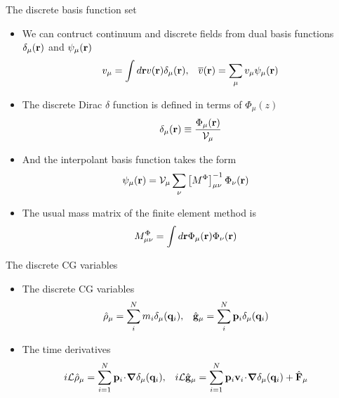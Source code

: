 \documentclass{beamer}
\newcommand{\esc}{\!\cdot\!}
\begin{document}
\begin{frame}{The discrete basis function set}
  \begin{itemize}
    \item We can contruct \alert{continuum and discrete fields} from dual basis functions $\delta_{\mu}({\bf r})$ and $\psi_\mu({\bf r})$ 
\begin{align}
  v_\mu=\int d{\bf r}v({\bf r})\delta_\mu({\bf r}),&&
    \overline{v}({\bf r}) =\sum_{\mu}v_\mu\psi_\mu({\bf r})
\nonumber
\end{align}
\item
The discrete  Dirac $\delta$ function is  defined in terms of  $\Phi_{\mu}(z)$
\begin{align}
  \delta_\mu({\bf r})\equiv\frac{\Phi_\mu({\bf r})}{{\cal V}_\mu}
\nonumber
\end{align}
\item And the interpolant basis function takes the form
  \begin{align}
  \psi_\mu({\bf r})&
  ={\cal V}_\mu \sum_\nu \left[M^{\Phi}\right]^{-1}_{\mu\nu} \Phi_\nu({\bf r})
\nonumber
\end{align}
\item The usual mass matrix of the finite element method is 
\begin{align}
  M^\Phi_{\mu\nu}&=\int d{\bf r}\Phi_\mu({\bf r})\Phi_\nu({\bf r})
\nonumber
\end{align}
\end{itemize}
\end{frame}

\begin{frame}{The discrete CG variables}
  \begin{itemize}
    \item The discrete CG variables
\begin{align}
  \hat{\rho}_\mu&= \sum_i^Nm_i\delta_\mu({\bf q}_i), &
\hat{\bf g}_\mu&= \sum_i^N{\bf p}_i\delta_\mu({\bf q}_i)
\nonumber
\end{align}
    \item The time derivatives
\begin{align}
  i{\cal L}  \hat{\rho}_{\mu}&=\sum_{i=1}^N{\bf p}_i\esc\boldsymbol{\nabla}\delta_\mu({\bf q}_i),&
i{\cal L}  \hat{\bf g}_{\mu}&=\sum_{i=1}^N{\bf p}_i{\bf v}_i\esc\boldsymbol{\nabla}\delta_\mu({\bf q}_i)
+\hat{\bf F}_\mu
\nonumber
\end{align}
  \end{itemize}
\end{frame}
\end{document}
